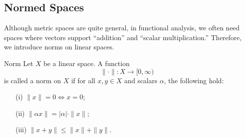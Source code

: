 \documentclass[a4paper]{article}
\begin{document}
\subsection{Normed Spaces}

Although metric spaces are quite general, in functional analysis, we often need spaces where vectors support “addition” and “scalar multiplication.” Therefore, we introduce norms on linear spaces.

\begin{dfn}{Norm}  
Let \(X\) be a linear space. A function  
\[
\|\cdot\| : X \to [0, \infty)
\]  
is called a norm on \(X\) if for all \(x, y \in X\) and scalars \(\alpha\), the following hold:  
\begin{itemize}  
    \item[(i)] \(\|x\| = 0 \iff x = 0\);  
    \item[(ii)] \(\|\alpha x\| = |\alpha| \cdot \|x\|\);  
    \item[(iii)] \(\|x + y\| \leq \|x\| + \|y\|\).  
\end{itemize}  
\end{dfn}
\end{document}
